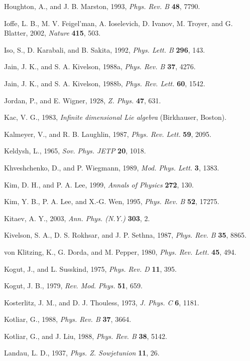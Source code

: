 \begin{list}{}{\setlength{\leftmargin}{2em}\setlength{\itemindent}{-2em}}
\item Houghton, A., and J. B. Marston, 1993, \emph{Phys. Rev. B} \textbf{48}, 7790.
\item Ioffe, L. B., M. V. Feigel'man, A. Ioselevich, D. Ivanov, M. Troyer, and G. Blatter, 2002, \emph{Nature} \textbf{415}, 503.
\item Iso, S., D. Karabali, and B. Sakita, 1992, \emph{Phys. Lett. B} \textbf{296}, 143.
\item Jain, J. K., and S. A. Kivelson, 1988a, \emph{Phys. Rev. B} \textbf{37}, 4276.
\item Jain, J. K., and S. A. Kivelson, 1988b, \emph{Phys. Rev. Lett.} \textbf{60}, 1542.
\item Jordan, P., and E. Wigner, 1928, \emph{Z. Phys.} \textbf{47}, 631.
\item Kac, V. G., 1983, \emph{Infinite dimensional Lie algebra} (Birkhauser, Boston).
\item Kalmeyer, V., and R. B. Laughlin, 1987, \emph{Phys. Rev. Lett.} \textbf{59}, 2095.
\item Keldysh, L., 1965, \emph{Sov. Phys. JETP} \textbf{20}, 1018.
\item Khveshchenko, D., and P. Wiegmann, 1989, \emph{Mod. Phys. Lett.} \textbf{3}, 1383.
\item Kim, D. H., and P. A. Lee, 1999, \emph{Annals of Physics} \textbf{272}, 130.
\item Kim, Y. B., P. A. Lee, and X.-G. Wen, 1995, \emph{Phys. Rev. B} \textbf{52}, 17275.
\item Kitaev, A. Y., 2003, \emph{Ann. Phys. (N.Y.)} \textbf{303}, 2.
\item Kivelson, S. A., D. S. Rokhsar, and J. P. Sethna, 1987, \emph{Phys. Rev. B} \textbf{35}, 8865.
\item von Klitzing, K., G. Dorda, and M. Pepper, 1980, \emph{Phys. Rev. Lett.} \textbf{45}, 494.
\item Kogut, J., and L. Susskind, 1975, \emph{Phys. Rev. D} \textbf{11}, 395.
\item Kogut, J. B., 1979, \emph{Rev. Mod. Phys.} \textbf{51}, 659.
\item Kosterlitz, J. M., and D. J. Thouless, 1973, \emph{J. Phys. C} \textbf{6}, 1181.
\item Kotliar, G., 1988, \emph{Phys. Rev. B} \textbf{37}, 3664.
\item Kotliar, G., and J. Liu, 1988, \emph{Phys. Rev. B} \textbf{38}, 5142.
\item Landau, L. D., 1937, \emph{Phys. Z. Sowjetunion} \textbf{11}, 26.

\end{list}
